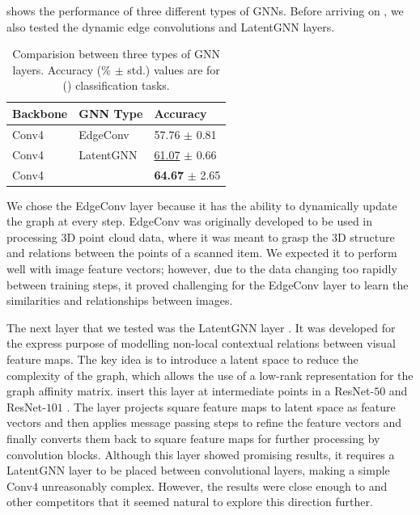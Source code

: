  shows the performance of three different types of GNNs. Before arriving on \samp{}, we also tested the dynamic edge convolutions \parencite{wang2019dynamic} and LatentGNN \parencite{zhang2019latentgnn} layers.

\begin{table}[ht]
    \centering
    \begin{tabularx}{290pt}{Y Y Y}
    \toprule
        \textbf{Backbone} & \textbf{GNN Type} & \textbf{Accuracy} \\ 
        \midrule
        Conv4 & EdgeConv \citeyearpar{wang2019dynamic} & 57.76 $\pm$ 0.81 \\
        Conv4 & LatentGNN \citeyearpar{zhang2019latentgnn} & \underline{61.07} $\pm$ 0.66 \\
        Conv4 & \samp{}  & \textbf{64.67} $\pm$ 2.65 \\
        \bottomrule
    \end{tabularx}
    \caption{Comparision between three types of GNN layers. Accuracy ($\%$ $\pm$ std.) values are for () \miniImagenet{} classification tasks.}
    \label{tab:gnn-types}
\end{table}

We chose the EdgeConv layer because it has the ability to dynamically update the graph at every step. EdgeConv was originally developed to be used in processing 3D point cloud data, where it was meant to grasp the 3D structure and relations between the points of a scanned item.
We expected it to perform well with image feature vectors; however, due to the data changing too rapidly between training steps, it proved challenging for the EdgeConv layer to learn the similarities and relationships between images.

The next layer that we tested was the LatentGNN layer \parencite{zhang2019latentgnn}. It was developed for the express purpose of modelling non-local contextual relations between visual feature maps. The key idea is to introduce a latent space to reduce the complexity of the graph, which allows the use of a low-rank representation for the graph affinity matrix. \textcite{zhang2019latentgnn} insert this layer at intermediate points in a ResNet-$50$ and ResNet-$101$ \parencite{He2015}. The layer projects square feature maps to latent space as feature vectors and then applies message passing steps to refine the feature vectors and finally converts them back to square feature maps for further processing by convolution blocks.
Although this layer showed promising results, it requires a LatentGNN layer to be placed between convolutional layers, making a simple Conv$4$ unreasonably complex. However, the results were close enough to \ccclr{} and other competitors that it seemed natural to explore this direction further.

